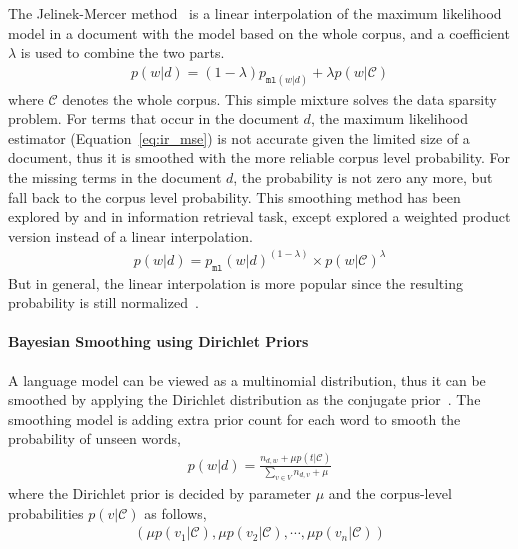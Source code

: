The Jelinek-Mercer method~\citep{Jelinek-1980} is a linear
interpolation of the maximum likelihood model in a document with the
model based on the whole corpus, and a coefficient $\lambda$ is used
to combine the two parts.
\begin{align}
p(w|d) = (1 - \lambda) p_{\texttt{ml}(w|d)} + \lambda p(w|\mathcal{C})
\end{align}
where $\mathcal{C}$ denotes the whole corpus. This simple mixture
solves the data sparsity problem. For terms that occur in the document
$d$, the maximum likelihood estimator (Equation~\ref{eq:ir_mse}) is
not accurate given the limited size of a document, thus it is smoothed
with the more reliable corpus level probability. For the missing terms
in the document $d$, the probability is not zero any more, but fall
back to the corpus level probability. This smoothing method has been
explored by \cite{PonteCroft} and \cite{song-99} in information
retrieval task, except \cite{PonteCroft} explored a weighted product
version instead of a linear interpolation.
\begin{align}
p(w|d) = p_{\texttt{ml}}(w|d)^{(1 - \lambda) } \times p(w|\mathcal{C})^{\lambda}
\label{eq:lm-jr}
\end{align}
But in general, the linear interpolation is more popular since the
resulting probability is still normalized~\citep{song-99}.

\paragraph{Bayesian Smoothing using Dirichlet Priors}

A language model can be viewed as a multinomial distribution, thus it
can be smoothed by applying the Dirichlet distribution as the
conjugate prior~\citep{mackay95dirichlet}. The smoothing model is
adding extra prior count for each word to smooth the probability of
unseen words,
\begin{align}
p(w|d) = \frac{n_{d,w} + \mu p(t|\mathcal{C})}{\sum_{v \in V} n_{d,v} + \mu}
\end{align}
where the Dirichlet prior is decided by parameter $\mu$ and the
corpus-level probabilities $p(v|\mathcal{C})$ as follows,
\begin{align}
(\mu p(v_1 | \mathcal{C}), \mu p(v_2 | \mathcal{C}), \cdots, \mu p(v_n | \mathcal{C}))
\label{eq:lm-bs}
\end{align}


